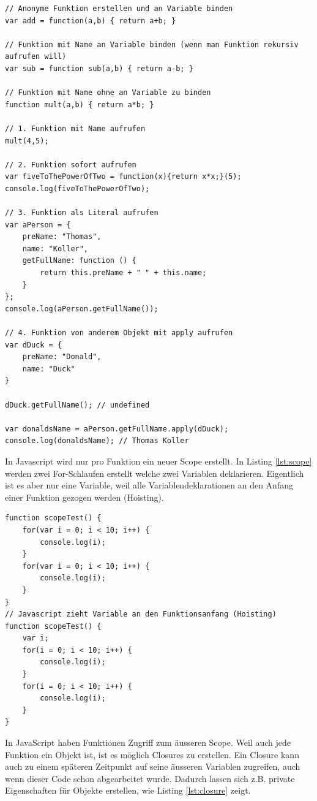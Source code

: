 \begin{lstlisting}[label=lst:methoden-aufruf,caption=Methoden aufrufen]
// Anonyme Funktion erstellen und an Variable binden
var add = function(a,b) { return a+b; }

// Funktion mit Name an Variable binden (wenn man Funktion rekursiv aufrufen will)
var sub = function sub(a,b) { return a-b; }

// Funktion mit Name ohne an Variable zu binden
function mult(a,b) { return a*b; }

// 1. Funktion mit Name aufrufen
mult(4,5);

// 2. Funktion sofort aufrufen
var fiveToThePowerOfTwo = function(x){return x*x;}(5);
console.log(fiveToThePowerOfTwo);

// 3. Funktion als Literal aufrufen
var aPerson = {
	preName: "Thomas",
	name: "Koller",
	getFullName: function () {
		return this.preName + " " + this.name;
	}
};
console.log(aPerson.getFullName());

// 4. Funktion von anderem Objekt mit apply aufrufen
var dDuck = {
	preName: "Donald",
	name: "Duck"
}

dDuck.getFullName(); // undefined

var donaldsName = aPerson.getFullName.apply(dDuck);
console.log(donaldsName); // Thomas Koller
\end{lstlisting}

In Javascript wird nur pro Funktion ein neuer Scope erstellt. In Listing \ref{lst:scope} werden zwei For-Schlaufen erstellt welche zwei Variablen deklarieren. Eigentlich ist es aber nur eine Variable, weil alle Variablendeklarationen an den Anfang einer Funktion gezogen werden (Hoisting). 

\begin{lstlisting}[label=lst:scope,caption=Scope]
function scopeTest() {
	for(var i = 0; i < 10; i++) {
		console.log(i);
	}
	for(var i = 0; i < 10; i++) {
		console.log(i);
	}
}
// Javascript zieht Variable an den Funktionsanfang (Hoisting)
function scopeTest() {
	var i;
	for(i = 0; i < 10; i++) {
		console.log(i);
	}
	for(i = 0; i < 10; i++) {
		console.log(i);
	}
}
\end{lstlisting}

In JavaScript haben Funktionen Zugriff zum äusseren Scope. Weil auch jede Funktion ein Objekt ist, ist es möglich Closures zu erstellen. Ein Closure kann auch zu einem späteren Zeitpunkt auf seine äusseren Variablen zugreifen, auch wenn dieser Code schon abgearbeitet wurde. Dadurch lassen sich z.B. private Eigenschaften für Objekte erstellen, wie Listing \ref{lst:closure} zeigt.


